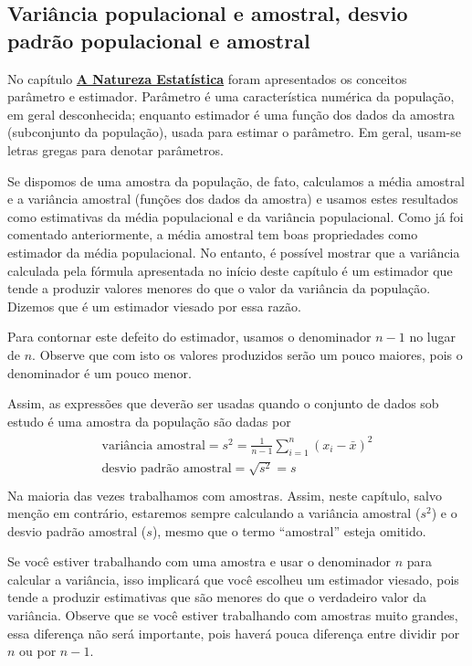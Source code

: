 {{\subsection{Variância populacional e amostral, desvio padrão populacional e amostral}

No capítulo \textbf{\hyperref[est1-chap]{A Natureza Estatística}} foram apresentados os conceitos parâmetro e estimador. Parâmetro é uma característica numérica da população, em geral desconhecida; enquanto estimador é uma função dos dados da amostra (subconjunto da população), usada para estimar o parâmetro. Em geral, usam-se letras gregas para denotar parâmetros.


Se dispomos de uma amostra da população, de fato, calculamos a média amostral e a variância amostral (funções dos dados da amostra) e usamos estes resultados como estimativas da média populacional e da variância populacional. Como já foi comentado anteriormente, a média amostral tem boas propriedades como estimador da média populacional. No entanto, é possível mostrar que a variância calculada pela fórmula apresentada no início deste capítulo é um estimador que tende a produzir valores menores do que o valor da variância da população. Dizemos que é um estimador viesado por essa razão.

Para contornar este defeito do estimador, usamos o denominador \(n-1\) no lugar de \(n\). Observe que com isto os valores produzidos serão um pouco maiores, pois o denominador é um pouco menor.

Assim, as expressões que deverão ser usadas quando o conjunto de dados sob estudo é uma amostra da população são dadas por
\begin{align*}\!\begin{aligned}
\text{variância amostral}=s^2=\frac{1}{n-1}\sum^n_{i=1}(x_i-\bar{x})^2\\
\text{desvio padrão amostral}=\sqrt{s^2}=s\\
\end{aligned}\end{align*}
Na maioria das vezes trabalhamos com amostras. Assim, neste capítulo, salvo menção em contrário, estaremos sempre calculando a variância amostral (\(s^2\)) e o desvio padrão amostral (\(s\)), mesmo que o termo “amostral”{} esteja omitido.

Se você estiver trabalhando com uma amostra e usar o denominador \(n\) para calcular a variância, isso implicará que você escolheu um estimador viesado, pois tende a produzir estimativas que são menores do que o verdadeiro valor da variância. Observe que se você estiver trabalhando com amostras muito grandes, essa diferença não será importante, pois haverá pouca diferença entre dividir por \(n\) ou por \(n-1\).

}}
